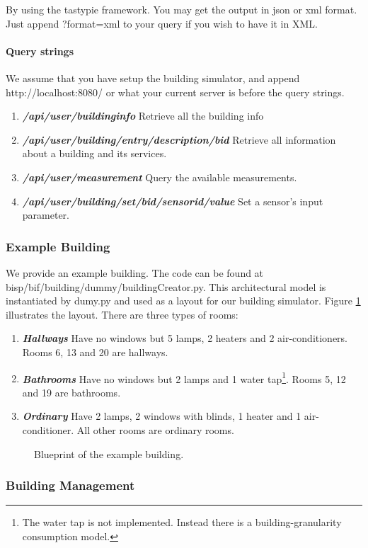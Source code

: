 \documentclass[10pt]{article}
\let\subsubsubsection\paragraph
\newcommand{\includeSVG}[1]{
  \texttt{[image: figs/\#1.pdf]}
}
\newcommand{\textdesc}[1]{\textit{\textbf{#1}}} %
\newcommand{\descitem}[1]{\item \textdesc{#1}}
\begin{document}
By using the tastypie framework. You may get the output in json or xml format. Just append
?format=xml to your query if you wish to have it in XML.

\subsubsubsection{Query strings}
We assume that you have setup the building simulator, and append http://localhost:8080/ or what your
current server is before the query strings.

\begin{enumerate}
				\descitem{/api/user/buildinginfo} Retrieve all the building info
				\descitem{/api/user/building/entry/description/bid} Retrieve all information about a
				building and its services.
				\descitem{/api/user/measurement} Query the available measurements.
				\descitem{/api/user/building/set/bid/sensorid/value} Set a sensor's input parameter.
\end{enumerate}

\subsubsection{Example Building}

We provide an example building. The code can be found at bisp/bif/building/dummy/buildingCreator.py. This architectural model is instantiated by dumy.py and used as a layout for our building simulator. Figure \ref{fig:building:example} illustrates the layout. There are three types of rooms:
\begin{enumerate}
  \descitem{Hallways} Have no windows but 5 lamps, 2 heaters and 2 air-conditioners. Rooms 6, 13 and 20 are hallways.
  \descitem{Bathrooms} Have no windows but 2 lamps and 1 water tap\footnote{The water tap is not implemented. Instead there is a building-granularity consumption model.}. Rooms 5, 12 and 19 are bathrooms.
  \descitem{Ordinary} Have 2 lamps, 2 windows with blinds, 1 heater and 1 air-conditioner. All other rooms are ordinary rooms.
\end{enumerate}

\begin{figure}[htbp]
  \begin{center}
    \rotatebox{0}{\scalebox{1.0}{\includeSVG{building0}}}
  \end{center}
  \caption{Blueprint of the example building.}
  \label{fig:building:example}
\end{figure}

\subsubsection{Building Management}
\end{document}

